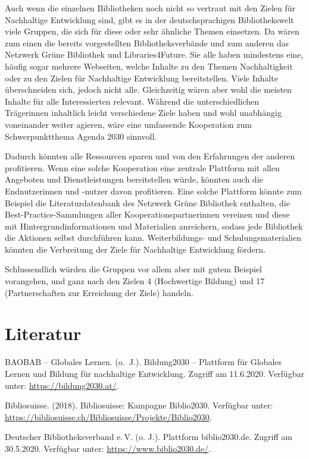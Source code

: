 \documentclass[a4paper,
fontsize=11pt,
oneside,
numbers=noperiodatend,
parskip=half-,
bibliography=totoc,
final
]{scrartcl}
\begin{document}
Auch wenn die einzelnen Bibliotheken noch nicht so vertraut mit den
Zielen für Nachhaltige Entwicklung sind, gibt es in der
deutschsprachigen Bibliothekswelt viele Gruppen, die sich für diese oder
sehr ähnliche Themen einsetzen. Da wären zum einen die bereits
vorgestellten Bibliotheksverbände und zum anderen das Netzwerk Grüne
Bibliothek und Libraries4Future. Sie alle haben mindestens eine, häufig
sogar mehrere Webseiten, welche Inhalte zu den Themen Nachhaltigkeit
oder zu den Zielen für Nachhaltige Entwicklung bereitstellen. Viele
Inhalte überschneiden sich, jedoch nicht alle. Gleichzeitig wären aber
wohl die meisten Inhalte für alle Interessierten relevant. Während die
unterschiedlichen Trägerinnen inhaltlich leicht verschiedene Ziele haben
und wohl unabhängig voneinander weiter agieren, wäre eine umfassende
Kooperation zum Schwerpunktthema Agenda 2030 sinnvoll.

Dadurch könnten alle Ressourcen sparen und von den Erfahrungen der
anderen profitieren. Wenn eine solche Kooperation eine zentrale
Plattform mit allen Angeboten und Dienstleistungen bereitstellen würde,
könnten auch die Endnutzerinnen und -nutzer davon profitieren. Eine
solche Plattform könnte zum Beispiel die Literaturdatenbank des Netzwerk
Grüne Bibliothek enthalten, die Best-Practice-Sammlungen aller
Kooperationspartnerinnen vereinen und diese mit Hintergrundinformationen
und Materialien anreichern, sodass jede Bibliothek die Aktionen selbst
durchführen kann. Weiterbildungs- und Schulungsmaterialien könnten die
Verbreitung der Ziele für Nachhaltige Entwicklung fördern.

Schlussendlich würden die Gruppen vor allem aber mit gutem Beispiel
vorangehen, und ganz nach den Zielen 4 (Hochwertige Bildung) und 17
(Partnerschaften zur Erreichung der Ziele) handeln.

\hypertarget{literatur}{%
\section{Literatur}\label{literatur}}

BAOBAB -- Globales Lernen. (o.~J.). Bildung2030 -- Plattform für
Globales Lernen und Bildung für nachhaltige Entwicklung. Zugriff am
11.6.2020. Verfügbar unter: \url{https://bildung2030.at/}.

Bibliosuisse. (2018). Bibliosuisse: Kampagne Biblio2030. Verfügbar
unter: \url{https://bibliosuisse.ch/Bibliosuisse/Projekte/Biblio2030}.

Deutscher Bibliotheksverband e.\,V. (o. J.). Plattform biblio2030.de.
Zugriff am 30.5.2020. Verfügbar unter: \url{https://www.biblio2030.de/}.
\end{document}
